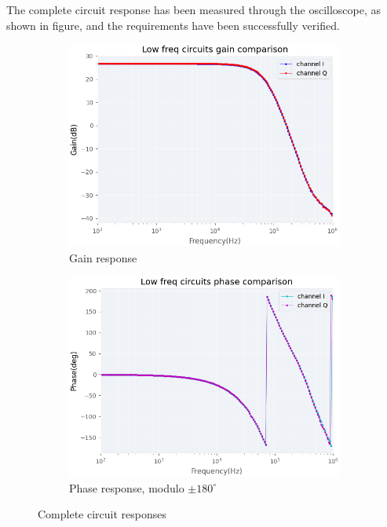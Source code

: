 \documentclass[12pt]{article}
\begin{document}
The complete circuit response has been measured through the oscilloscope, as shown in figure, and the requirements have been successfully verified.
\begin{figure}[H]
    \centering
    \begin{subfigure}{0.49\textwidth}
    \includegraphics[width=\textwidth]{circuitgain.png}
    \caption{Gain response}
    \end{subfigure}
    \begin{subfigure}{0.49\textwidth}
     \includegraphics[width=\textwidth]{circuitphase.png}
           \caption{Phase response, modulo $\pm180^{\circ}$}
    \end{subfigure}
    \caption{Complete circuit responses}
    \end{figure}
\end{document}
